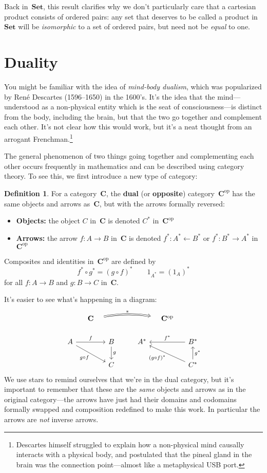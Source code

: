 \documentclass[letterpaper,12pt]{article}
\newcommand{\from}{\leftarrow}
\newcommand{\after}{\circ}
\newcommand{\cat}[1]{\mathbf{#1}}
\newcommand{\dual}[1]{#1^{\mathrm{op}}}
\newcommand{\Set}{\cat{Set}}
\renewcommand{\star}[1]{#1^{*}}
\newcommand{\textdefn}{\textbf}
\theoremstyle{definition}
\newtheorem{defn}[equation]{Definition}
\theoremstyle{plain}
\numberwithin{equation}{section}
\begin{document}
Back in~\(\Set\), this result clarifies why we don't particularly care that a cartesian product consists of ordered pairs: any set that deserves to be called a product in~\(\Set\) will be \emph{isomorphic} to a set of ordered pairs, but need not be \emph{equal} to one.

\section{Duality}
You might be familiar with the idea of \emph{mind-body dualism}, which was popularized by Ren\'e Descartes (1596--1650) in the 1600's. It's the idea that the mind---understood as a non-physical entity which is the seat of consciousness---is distinct from the body, including the brain, but that the two go together and complement each other. It's not clear how this would work, but it's a neat thought from an arrogant Frenchman.\footnote{Descartes himself struggled to explain how a non-physical mind causally interacts with a physical body, and postulated that the pineal gland in the brain was the connection point---almost like a metaphysical USB port.}

The general phenomenon of two things going together and complementing each other occurs frequently in  mathematics and can be described using category theory. To see this, we first introduce a new type of category:
\begin{defn}
For a category~\(\cat{C}\), the \textdefn{dual} (or \textdefn{opposite}) category~\(\dual{\cat{C}}\) has the same objects and arrows as~\(\cat{C}\), but with the arrows formally reversed:
\begin{itemize}
\item \textbf{Objects:} the object \(C\) in~\(\cat{C}\) is denoted \(\star{C}\) in~\(\dual{\cat{C}}\)
\item \textbf{Arrows:} the arrow \(f:A\to B\) in~\(\cat{C}\) is denoted \(\star{f}:\star{A}\from\star{B}\) or \(\star{f}:\star{B}\to\star{A}\) in~\(\dual{\cat{C}}\)
\end{itemize}
Composites and identities in~\(\dual{\cat{C}}\) are defined by
\[\star{f}\after\star{g}=\star{(g\after f)}\qquad 1_{\star{A}}=\star{(1_A)}\]
for all \(f:A\to B\) and \(g:B\to C\) in~\(\cat{C}\).
\end{defn}
\noindent It's easier to see what's happening in a diagram:
\begin{equation}
\begin{tikzcd}[column sep=small]
& \cat{C} \ar[rrrr, Rightarrow, shorten=1em, bend left=10, "*"] &&&& \dual{\cat{C}} & \\
A \ar[rrd, "g\after f"'] \ar[rr,"f"] && B \ar[d,"g"] && \star{A} && \star{B} \ar[ll,"\star{f}"'] \\
  && C && && \star{C} \ar[llu, "\star{(g\after f)}"] \ar[u,"\star{g}"']
\end{tikzcd}
\end{equation}
We use stars to remind ourselves that we're in the dual category, but it's important to remember that these are the \emph{same} objects and arrows as in the original category---the arrows have just had their domains and codomains formally swapped and composition redefined to make this work. In particular the arrows are \emph{not} inverse arrows.
\end{document}

